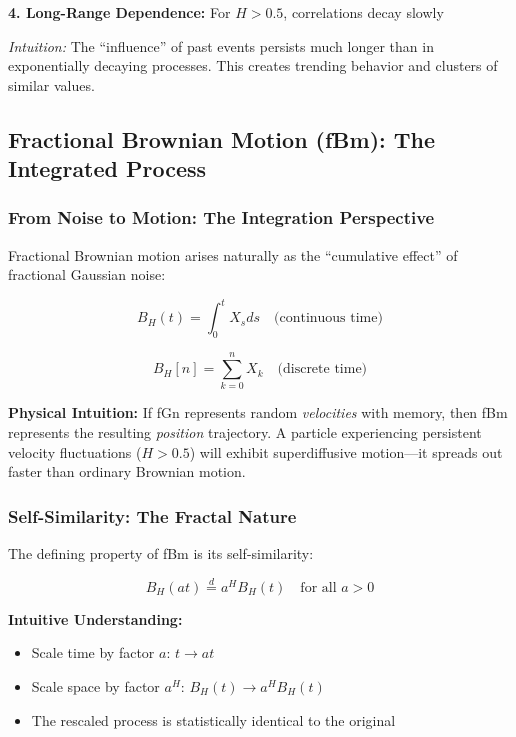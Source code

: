 \documentclass[11pt,a4paper]{article}
\begin{document}
\textbf{4. Long-Range Dependence:} For $H > 0.5$, correlations decay slowly

\emph{Intuition:} The ``influence'' of past events persists much longer than in exponentially decaying processes. This creates trending behavior and clusters of similar values.

\subsection{Fractional Brownian Motion (fBm): The Integrated Process}

\subsubsection{From Noise to Motion: The Integration Perspective}

Fractional Brownian motion arises naturally as the ``cumulative effect'' of fractional Gaussian noise:

\begin{equation}
B_H(t) = \int_0^t X_s ds \quad \text{(continuous time)}
\end{equation}

\begin{equation}
B_H[n] = \sum_{k=0}^{n} X_k \quad \text{(discrete time)}
\end{equation}

\textbf{Physical Intuition:} If fGn represents random \emph{velocities} with memory, then fBm represents the resulting \emph{position} trajectory. A particle experiencing persistent velocity fluctuations ($H > 0.5$) will exhibit superdiffusive motion—it spreads out faster than ordinary Brownian motion.

\subsubsection{Self-Similarity: The Fractal Nature}

The defining property of fBm is its self-similarity:

\begin{equation}
B_H(at) \stackrel{d}{=} a^H B_H(t) \quad \text{for all } a > 0
\end{equation}

\textbf{Intuitive Understanding:} 
\begin{itemize}
    \item Scale time by factor $a$: $t \to at$
    \item Scale space by factor $a^H$: $B_H(t) \to a^H B_H(t)$
    \item The rescaled process is statistically identical to the original
\end{itemize}
\end{document}
